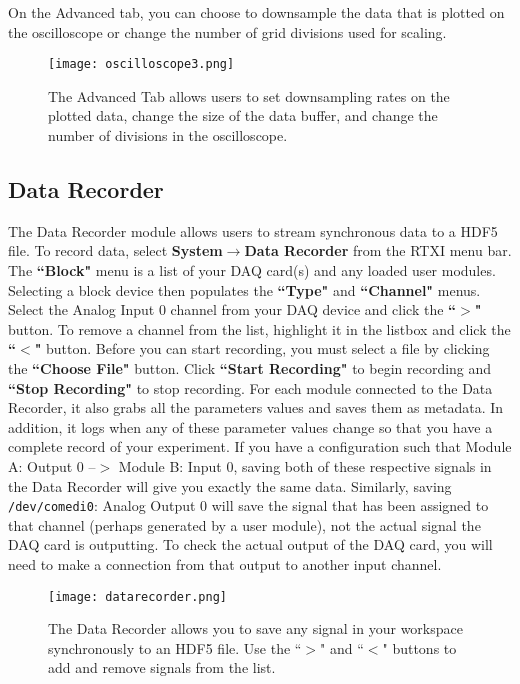 \newpage
{}On the Advanced tab, you can choose to downsample the data that is plotted on the oscilloscope or change the number of grid divisions used for scaling.

\begin{figure}[h]
\begin{center}
\texttt{[image: oscilloscope3.png]} 
\caption[Oscilloscope: Advanced Tab]{The Advanced Tab allows users to set downsampling rates on the plotted data, change the size of the data buffer, and change the number of divisions in the oscilloscope.} 
\end{center}
\label{fig:oscilloscope3}
\end{figure}

\subsection{Data Recorder}

The Data Recorder module allows users to stream synchronous data to a HDF5 file. To record data, select \textbf{System}$\rightarrow$\textbf{Data Recorder} from the RTXI menu bar. The \textbf{``Block"} menu is a list of your DAQ card(s) and any loaded user modules. Selecting a block device then populates the \textbf{``Type"} and \textbf{``Channel"} menus. Select the Analog Input 0 channel from your DAQ device and click the \textbf{``$>$"} button. To remove a channel from the list, highlight it in the listbox and click the \textbf{``$<$"} button. Before you can start recording, you must select a file by clicking the \textbf{``Choose File"} button. Click \textbf{``Start Recording"} to begin recording and \textbf{``Stop Recording"} to stop recording. For each module connected to the Data Recorder, it also grabs all the parameters values and saves them as metadata. In addition, it logs when any of these parameter values change so that you have a complete record of your experiment. If you have a configuration such that Module A: Output 0 --$>$ Module B: Input 0, saving both of these respective signals in the Data Recorder will give you exactly the same data. Similarly, saving \texttt{/dev/comedi0}: Analog Output 0 will save the signal that has been assigned to that channel (perhaps generated by a user module), not the actual signal the DAQ card is outputting. To check the actual output of the DAQ card, you will need to make a connection from that output to another input channel.

\begin{figure}[h]
\begin{center}
\texttt{[image: datarecorder.png]} 
\caption[Data Recorder]{The Data Recorder allows you to save any signal in your workspace synchronously to an HDF5 file. Use the  ``$>$" and ``$<$" buttons to add and remove signals from the list.} 
\end{center}
\label{fig:datarecorder}
\end{figure}

